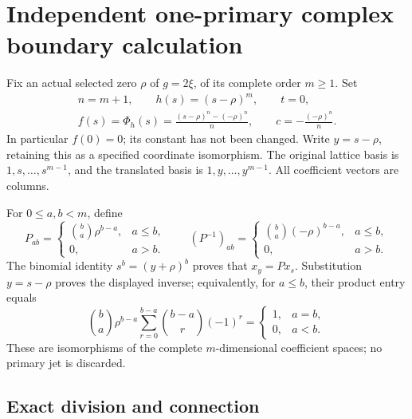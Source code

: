 \section*{Independent one-primary complex boundary calculation}

Fix an actual selected zero \(\rho\) of \(g=2\xi\), of its complete
order \(m\geq1\). Set
\[
 \begin{gathered}
 n=m+1,\qquad h(s)=(s-\rho)^m,\qquad t=0,\\
 f(s)=\Phi_h(s)=\frac{(s-\rho)^n-(-\rho)^n}{n},\qquad
 c=-\frac{(-\rho)^n}{n}.
 \end{gathered}
 \tag{SPR.1}
\]
In particular \(f(0)=0\); its constant has not been changed.
Write \(y=s-\rho\), retaining this as a specified coordinate
isomorphism. The original lattice basis is
\(1,s,\ldots,s^{m-1}\), and the translated basis is
\(1,y,\ldots,y^{m-1}\). All coefficient vectors are columns.

For \(0\leq a,b<m\), define
\[
 P_{ab}=
 \begin{cases}\binom ba\rho^{b-a},&a\leq b,\\0,&a>b.\end{cases}
 \qquad
 (P^{-1})_{ab}=
 \begin{cases}\binom ba(-\rho)^{b-a},&a\leq b,\\0,&a>b.\end{cases}
 \tag{SPR.2}
\]
The binomial identity \(s^b=(y+\rho)^b\) proves that \(x_y=P x_s\).
Substitution \(y=s-\rho\) proves the displayed inverse; equivalently,
for \(a\leq b\), their product entry equals
\[
 \binom ba\rho^{b-a}
 \sum_{r=0}^{b-a}\binom{b-a}{r}(-1)^r
 =\begin{cases}1,&a=b,\\0,&a<b.\end{cases}
\]
These are isomorphisms of the complete \(m\)-dimensional coefficient
spaces; no primary jet is discarded.

\subsection*{Exact division and connection}

